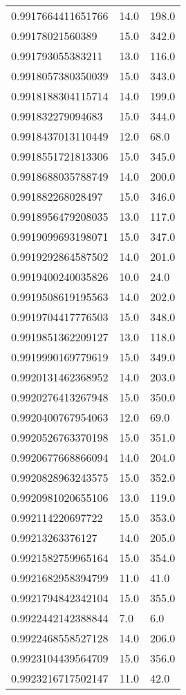\begin{center}
\begin{supertabular}[H]{p{0.30\textwidth}p{0.05\textwidth}p{0.05\textwidth}}
0.9917664411651766 & 14.0 & 198.0 \\ 
0.99178021560389 & 15.0 & 342.0 \\ 
0.991793055383211 & 13.0 & 116.0 \\ 
0.9918057380350039 & 15.0 & 343.0 \\ 
0.9918188304115714 & 14.0 & 199.0 \\ 
0.991832279094683 & 15.0 & 344.0 \\ 
0.9918437013110449 & 12.0 & 68.0 \\ 
0.9918551721813306 & 15.0 & 345.0 \\ 
0.9918688035788749 & 14.0 & 200.0 \\ 
0.991882268028497 & 15.0 & 346.0 \\ 
0.9918956479208035 & 13.0 & 117.0 \\ 
0.9919099693198071 & 15.0 & 347.0 \\ 
0.9919292864587502 & 14.0 & 201.0 \\ 
0.9919400240035826 & 10.0 & 24.0 \\ 
0.9919508619195563 & 14.0 & 202.0 \\ 
0.9919704417776503 & 15.0 & 348.0 \\ 
0.9919851362209127 & 13.0 & 118.0 \\ 
0.9919990169779619 & 15.0 & 349.0 \\ 
0.9920131462368952 & 14.0 & 203.0 \\ 
0.9920276413267948 & 15.0 & 350.0 \\ 
0.9920400767954063 & 12.0 & 69.0 \\ 
0.9920526763370198 & 15.0 & 351.0 \\ 
0.9920677668866094 & 14.0 & 204.0 \\ 
0.9920828963243575 & 15.0 & 352.0 \\ 
0.9920981020655106 & 13.0 & 119.0 \\ 
0.992114220697722 & 15.0 & 353.0 \\ 
0.99213263376127 & 14.0 & 205.0 \\ 
0.9921582759965164 & 15.0 & 354.0 \\ 
0.9921682958394799 & 11.0 & 41.0 \\ 
0.9921794842342104 & 15.0 & 355.0 \\ 
0.9922442142388844 & 7.0 & 6.0 \\ 
0.9922468558527128 & 14.0 & 206.0 \\ 
0.9923104439564709 & 15.0 & 356.0 \\ 
0.9923216717502147 & 11.0 & 42.0 \\ 

\end{supertabular}
\end{center}
